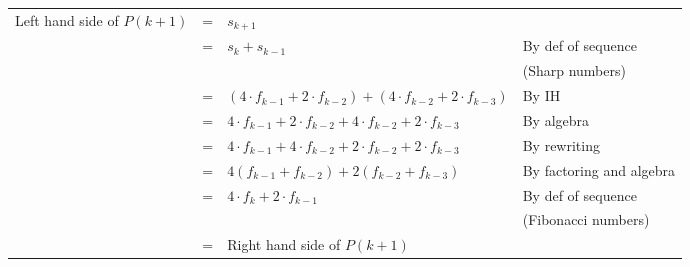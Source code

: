 \documentclass{article}
\begin{document}
\begin{adjustwidth}{-1.5cm}{}
\noindent
\hspace{-3cm}
\begin{sloppypar}
	\begin{tabular}{l l l l}
		Left hand side of $P(k+1)$ & = & $s_{k+1}$ & \\
								   & = & $s_{k}+s_{k-1}$ & By def of sequence \\
								   &  & & (Sharp numbers)\\
								   & = & $(4\cdot f_{k-1}+2\cdot f_{k-2})+(4\cdot f_{k-2}+2\cdot f_{k-3})$ & By IH \\
								   & = & $4\cdot f_{k-1}+2\cdot f_{k-2}+4\cdot f_{k-2}+2\cdot f_{k-3}$ & By algebra\\
								   & = & $4\cdot f_{k-1}+4\cdot f_{k-2}+2\cdot f_{k-2}+2\cdot f_{k-3}$ & By rewriting \\
								   & = & $4(f_{k-1}+f_{k-2}) + 2(f_{k-2}+f_{k-3})$ & By factoring and algebra \\
								   & = & $4\cdot f_{k} + 2\cdot f_{k-1}$ & By def of sequence \\
								   &   & & (Fibonacci numbers)\\
								   & = & Right hand side of $P(k+1)$ & \\
								   
	\end{tabular}
\end{sloppypar}
\end{adjustwidth}
\vspace{15pt}
\end{document}
